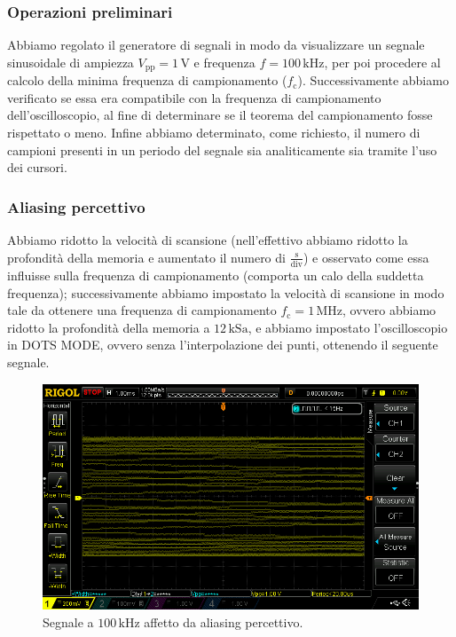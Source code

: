 \documentclass{article}
\begin{document}
			\subsubsection{Operazioni preliminari}
				Abbiamo regolato il generatore di segnali in modo da visualizzare un segnale sinusoidale di ampiezza $ V_{\mathrm{pp}} = 1 \, \mathrm{V} $ e frequenza $ f = 100 \, \mathrm{kHz} $, per poi procedere al calcolo della minima frequenza di campionamento ($ f_{\mathrm{c}} $). Successivamente abbiamo verificato se essa era compatibile con la frequenza di campionamento dell'oscilloscopio, al fine di determinare se il teorema del campionamento fosse rispettato o meno. Infine abbiamo determinato, come richiesto, il numero di campioni presenti in un periodo del segnale sia analiticamente sia tramite l'uso dei cursori.
			\subsubsection{Aliasing percettivo}
				Abbiamo ridotto la velocità di scansione (nell'effettivo abbiamo ridotto la profondità della memoria e aumentato il numero di $ \mathrm{\frac{s}{div}} $) e osservato come essa influisse sulla frequenza di campionamento (comporta un calo della suddetta frequenza); successivamente abbiamo impostato la velocità di scansione in modo tale da ottenere una frequenza di campionamento $ f_{\mathrm{c}} = 1 \, \mathrm{MHz} $, ovvero abbiamo ridotto la profondità della memoria a $ 12 \, \mathrm{kSa} $, e abbiamo impostato l'oscilloscopio in DOTS MODE, ovvero senza l'interpolazione dei punti, ottenendo il seguente segnale.
				\newline
				\begin{figure}[h!]
					\centering
					\includegraphics[scale=0.4]{aliasingPercettivo1MHz}
					\caption{Segnale a $ 100 \, \mathrm{kHz} $ affetto da aliasing percettivo.}
					\label{fig:aliasingPercettivo1MHz}
				\end{figure}
\end{document}
